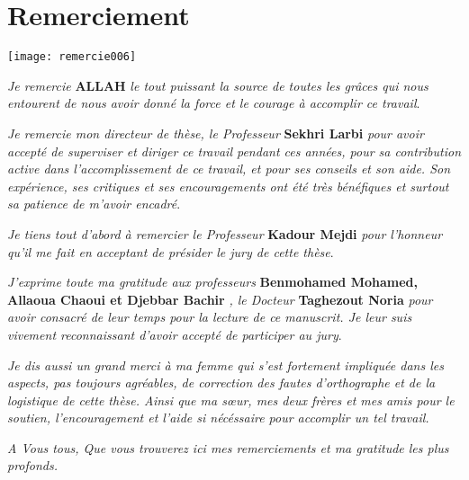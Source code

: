 ﻿\newpage
\section*{Remerciement}

\begin{flushright}
\texttt{[image: remercie006]}
\end{flushright}

\textit{Je remercie} \textbf{ALLAH} \textit{le tout puissant la source de toutes les grâces qui nous entourent de nous avoir donné la force et le courage à accomplir ce travail}.  

\textit{Je remercie mon directeur de thèse, le Professeur} \textbf{Sekhri Larbi} \textit{pour avoir accepté de superviser et diriger ce travail pendant ces années, pour sa contribution active dans l’accomplissement de ce travail, et pour ses conseils et son aide. Son expérience, ses critiques et ses encouragements ont été très bénéfiques et surtout sa patience de m'avoir encadré}. 

\textit{Je tiens tout d’abord à remercier le Professeur} \textbf{Kadour Mejdi} \textit{pour l’honneur qu’il me fait en acceptant de présider le jury de cette thèse}. 

\textit{J'exprime toute ma gratitude aux professeurs} \textbf{Benmohamed Mohamed, Allaoua Chaoui et Djebbar  Bachir} \textit{, le Docteur } \textbf{Taghezout Noria} \textit{pour avoir consacré de leur temps pour la lecture de ce manuscrit. Je leur suis vivement reconnaissant d’avoir accepté de participer au jury}.

\textit{Je dis aussi un grand merci à ma femme qui s’est fortement impliquée dans les aspects, pas toujours agréables, de correction des fautes d’orthographe et de la logistique de cette thèse. Ainsi que ma sœur, mes deux frères et mes amis pour le soutien, l'encouragement et l'aide si nécéssaire pour accomplir un tel travail.}

\textit{A Vous tous, Que vous trouverez ici mes remerciements et ma gratitude les plus profonds.}
